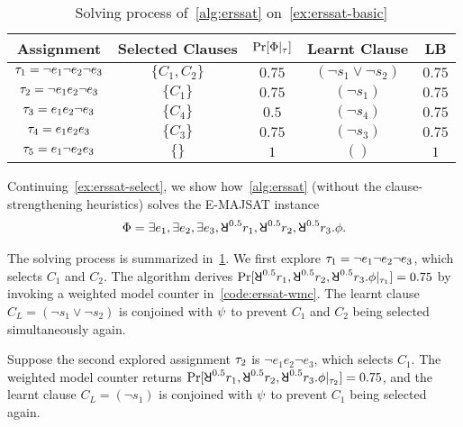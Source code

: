 \begin{example}
    \label{ex:erssat-basic}
    \begin{table}[t]
        \centering
        \caption{Solving process of~\cref{alg:erssat} on~\cref{ex:erssat-basic}}
        \label{tbl:erssat-solve-example}
        \small
        \begin{tabular}{c|c|c|c|c}
            Assignment                            & Selected Clauses & $\Pr[\Phi|_{\tau}]$ & Learnt Clause                & LB     \\
            \hline
            $\tau_1=\lnot e_1 \lnot e_2 \lnot e_3$ & $\{C_1,C_2\}$    & $0.75$                 & $(\lnot s_1 \lor \lnot s_2)$ & $0.75$ \\
            $\tau_2=\lnot e_1 e_2 \lnot e_3$       & $\{C_1\}$        & $0.75$                 & $(\lnot s_1)$                & $0.75$ \\
            $\tau_3=e_1 e_2 \lnot e_3$             & $\{C_4\}$        & $0.5$                  & $(\lnot s_4)$                & $0.75$ \\
            $\tau_4=e_1 e_2 e_3$                   & $\{C_3\}$        & $0.75$                 & $(\lnot s_3)$                & $0.75$ \\
            $\tau_5=e_1 \lnot e_2 e_3$             & $\{\}$           & $1$                    & $()$                         & $1$
        \end{tabular}
    \end{table}

    Continuing~\cref{ex:erssat-select},
    we show how~\cref{alg:erssat} (without the clause-strengthening heuristics) solves the E-MAJSAT instance
    \begin{align*}
        \Qf=\exists e_1,\exists e_2,\exists e_3,\random{0.5} r_1,\random{0.5} r_2,\random{0.5} r_3.\pf.
    \end{align*}

    The solving process is summarized in~\cref{tbl:erssat-solve-example}.
    We first explore $\tau_1=\lnot e_1 \lnot e_2 \lnot e_3$, which selects $C_1$ and $C_2$.
    The algorithm derives $\spb{\random{0.5} r_1,\random{0.5} r_2,\random{0.5} r_3.\pcf{\pf}{\as_1}}=0.75$ by invoking a weighted model counter in~\cref{code:erssat-wmc}.
    The learnt clause $C_L=(\lnot s_1 \lor \lnot s_2)$ is conjoined with $\psi$ to prevent $C_1$ and $C_2$ being selected simultaneously again.

    Suppose the second explored assignment $\tau_2$ is $\lnot e_1 e_2 \lnot e_3$,
    which selects $C_1$.
    The weighted model counter returns $\spb{\random{0.5} r_1,\random{0.5} r_2,\random{0.5} r_3.\pcf{\pf}{\as_2}}=0.75$,
    and the learnt clause $C_L=(\lnot s_1)$ is conjoined with $\psi$ to prevent $C_1$ being selected again.


\end{example}
